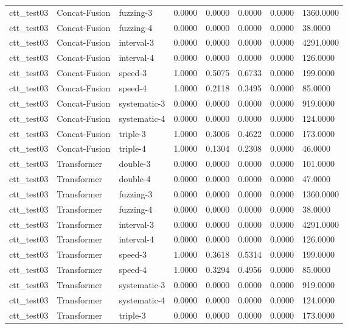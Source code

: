 \begin{tabular}{llllllll}
ctt_test03 & Concat-Fusion & fuzzing-3 & 0.0000 & 0.0000 & 0.0000 & 0.0000 & 1360.0000 \\
ctt_test03 & Concat-Fusion & fuzzing-4 & 0.0000 & 0.0000 & 0.0000 & 0.0000 & 38.0000 \\
ctt_test03 & Concat-Fusion & interval-3 & 0.0000 & 0.0000 & 0.0000 & 0.0000 & 4291.0000 \\
ctt_test03 & Concat-Fusion & interval-4 & 0.0000 & 0.0000 & 0.0000 & 0.0000 & 126.0000 \\
ctt_test03 & Concat-Fusion & speed-3 & 1.0000 & 0.5075 & 0.6733 & 0.0000 & 199.0000 \\
ctt_test03 & Concat-Fusion & speed-4 & 1.0000 & 0.2118 & 0.3495 & 0.0000 & 85.0000 \\
ctt_test03 & Concat-Fusion & systematic-3 & 0.0000 & 0.0000 & 0.0000 & 0.0000 & 919.0000 \\
ctt_test03 & Concat-Fusion & systematic-4 & 0.0000 & 0.0000 & 0.0000 & 0.0000 & 124.0000 \\
ctt_test03 & Concat-Fusion & triple-3 & 1.0000 & 0.3006 & 0.4622 & 0.0000 & 173.0000 \\
ctt_test03 & Concat-Fusion & triple-4 & 1.0000 & 0.1304 & 0.2308 & 0.0000 & 46.0000 \\
ctt_test03 & Transformer & double-3 & 0.0000 & 0.0000 & 0.0000 & 0.0000 & 101.0000 \\
ctt_test03 & Transformer & double-4 & 0.0000 & 0.0000 & 0.0000 & 0.0000 & 47.0000 \\
ctt_test03 & Transformer & fuzzing-3 & 0.0000 & 0.0000 & 0.0000 & 0.0000 & 1360.0000 \\
ctt_test03 & Transformer & fuzzing-4 & 0.0000 & 0.0000 & 0.0000 & 0.0000 & 38.0000 \\
ctt_test03 & Transformer & interval-3 & 0.0000 & 0.0000 & 0.0000 & 0.0000 & 4291.0000 \\
ctt_test03 & Transformer & interval-4 & 0.0000 & 0.0000 & 0.0000 & 0.0000 & 126.0000 \\
ctt_test03 & Transformer & speed-3 & 1.0000 & 0.3618 & 0.5314 & 0.0000 & 199.0000 \\
ctt_test03 & Transformer & speed-4 & 1.0000 & 0.3294 & 0.4956 & 0.0000 & 85.0000 \\
ctt_test03 & Transformer & systematic-3 & 0.0000 & 0.0000 & 0.0000 & 0.0000 & 919.0000 \\
ctt_test03 & Transformer & systematic-4 & 0.0000 & 0.0000 & 0.0000 & 0.0000 & 124.0000 \\
ctt_test03 & Transformer & triple-3 & 0.0000 & 0.0000 & 0.0000 & 0.0000 & 173.0000 \\

\end{tabular}
